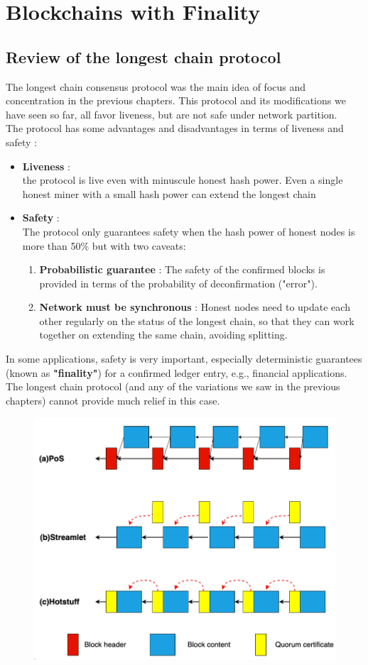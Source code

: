 \chapter{Blockchains with Finality}
\section{Review of the longest chain protocol}
The longest chain consensus protocol was the main idea of focus and concentration in the previous chapters. This protocol and its modifications we have seen so far, all favor liveness, but are not safe under network partition.\\
The protocol has some advantages and disadvantages in terms of liveness and safety :
\begin{itemize}
	\item \textbf{Liveness} : \\
	the protocol is live even with minuscule honest hash power. Even a single honest miner with a small hash power can extend the longest chain
	\item \textbf{Safety} : \\
	The protocol only guarantees safety when the hash power of honest nodes is more than 50\% but with two caveats:
	\begin{enumerate}
		\item \textbf{Probabilistic guarantee} :
		The safety of the confirmed blocks is provided in terms of the probability of deconfirmation ("error").
		\item \textbf{Network must be synchronous} :
		Honest nodes need to update each other regularly on the status of the longest chain, so that they can work together on extending the same chain, avoiding splitting.
	\end{enumerate}
\end{itemize}
In some applications, safety is very important, especially deterministic guarantees (known as \textbf{"finality"}) for a confirmed ledger entry, e.g., financial applications. The longest chain protocol (and any of the variations we saw in the previous chapters) cannot provide much relief in this case.
\begin{figure}[h!]
	\centering
	\includegraphics[width=0.5\linewidth]{Fig/L15_F8}
	\caption{}
	\label{fig:L15_f8}
\end{figure}


